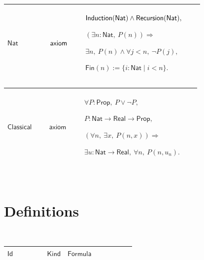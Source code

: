 \documentclass[12pt,reqno]{amsart}
\theoremstyle{blueplain}
\numberwithin{equation}{section}
\newlength{\FTCOneColumnBody}
\begin{document}
{\scriptsize \setlength{\parskip}{0pt}\nointerlineskip
\noindent 
\begin{tabular}{|@{}>{\centering\arraybackslash}m{0.19251\linewidth}|>{\centering\arraybackslash}m{0.16845\linewidth}|>{\centering\arraybackslash}m{0.53904\linewidth}|}
\hline
\hypertarget{ax:Nat}{$\displaystyle \mathsf{Nat}$} & $\displaystyle \mathsf{%
axiom}$ & $\displaystyle \mathsf{Induction}(\mathsf{Nat})\land\mathsf{%
Recursion}(\mathsf{Nat}),$\par$\displaystyle (\exists n:\mathsf{Nat},\
P(n))\Rightarrow$\par$\displaystyle \exists n,\ P(n)\land\forall j<n,\ \neg
P(j),$\par$\displaystyle \mathsf{Fin}(n):=\{i:\mathsf{Nat}\mid i<n\}.$ \\ 
\hline
\end{tabular}%
}

{\scriptsize \setlength{\parskip}{0pt}\nointerlineskip
\noindent 
\begin{tabular}{|@{}>{\centering\arraybackslash}m{0.19251\linewidth}|>{\centering\arraybackslash}m{0.16845\linewidth}|>{\centering\arraybackslash}m{0.53904\linewidth}|}
\hline
\hypertarget{ax:Classical}{$\displaystyle \mathsf{Classical}$} & $%
\displaystyle \mathsf{axiom}$ & $\displaystyle \forall P:\mathsf{Prop},\
P\lor\neg P,$\par$\displaystyle P:\mathsf{Nat}\to\mathsf{Real}\to\mathsf{Prop%
},$\par$\displaystyle (\forall n,\ \exists x,\ P(n,x))\Rightarrow$\par$%
\displaystyle \exists u:\mathsf{Nat}\to\mathsf{Real},\ \forall n,\ P(n,u_n).$
\\ \hline
\end{tabular}%
}

{\scriptsize \ }

\section{\protect\scriptsize Definitions}

{\scriptsize {\ }}

{\scriptsize \setlength{\parskip}{0pt}\nointerlineskip
\noindent 
\begin{tabular}{|@{}>{\centering\arraybackslash}m{\FTCOneColumnBody}|}
\hline
$\displaystyle \mathsf{Definitions}$ \\ \hline
\end{tabular}%
}

{\scriptsize \setlength{\parskip}{0pt}\nointerlineskip
\noindent 
\begin{tabular}{|@{}>{\centering\arraybackslash}m{0.19251\linewidth}|>{\centering\arraybackslash}m{0.16845\linewidth}|>{\centering\arraybackslash}m{0.53904\linewidth}|}
\hline
$\displaystyle \mathsf{Id}$ & $\displaystyle \mathsf{Kind}$ & $\displaystyle 
\mathsf{Formula}$ \\ \hline
\end{tabular}%
}
\end{document}
